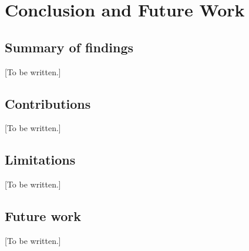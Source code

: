 \chapter{Conclusion and Future Work}\label{chap:conclusion}


\section{Summary of findings}
[To be written.]

\section{Contributions}
[To be written.]

\section{Limitations}
[To be written.]

\section{Future work}
[To be written.]
